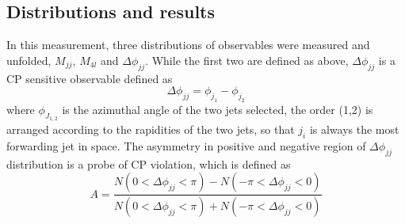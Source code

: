 \documentclass[12pt]{article}
\begin{document}
        \subsection{Distributions and results}
            \par In this measurement, three distributions of observables were measured and unfolded, $M_{jj}$, $M_{4l}$ and $\Delta{\phi}_{jj}$.
            While the first two are defined as above, $\Delta{\phi}_{jj}$ is a CP sensitive observable defined as 
            $$\Delta{\phi}_{jj} = \phi_{j_1} - \phi_{j_2}$$ 
            where $\phi_{J_{1,2}}$ is the azimuthal angle of the two jets selected, the order (1,2) is arranged according to the rapidities of 
            the two jets, so that $j_i$ is always the most forwarding jet in space. The asymmetry in positive and negative region of $\Delta{\phi}_{jj}$ 
            distribution is a probe of CP violation\cite{Bernlochner_2019}, which is defined as 
            $$A = \frac{N(0<\Delta{\phi}_{jj} <\pi) - N(-\pi<\Delta{\phi}_{jj} <0)}{N(0<\Delta{\phi}_{jj}<\pi) + N(-\pi<\Delta{\phi}_{jj} <0)}$$
\end{document}
